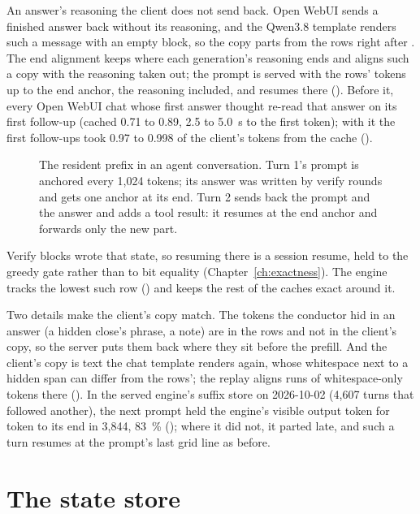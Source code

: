 An answer's reasoning the client does not send back. Open WebUI sends a finished answer back without its reasoning, and the Qwen3.8 template renders such a message with an empty  block, so the copy parts from the rows right after . The end alignment keeps where each generation's reasoning ends and aligns such a copy with the reasoning taken out; the prompt is served with the rows' tokens up to the end anchor, the reasoning included, and resumes there (). Before it, every Open WebUI chat whose first answer thought re-read that answer on its first follow-up (cached 0.71 to 0.89, 2.5 to 5.0~s to the first token); with it the first follow-ups took 0.97 to 0.998 of the client's tokens from the cache (\measured).

\begin{figure}[htbp]
\centering

\caption[The resident prefix and the end anchor]{The resident prefix in an agent conversation. Turn 1's prompt is anchored every 1,024 tokens; its answer was written by verify rounds and gets one anchor at its end. Turn 2 sends back the prompt and the answer and adds a tool result: it resumes at the end anchor and forwards only the new part.}\label{fig:resident}
\end{figure}

Verify blocks wrote that state, so resuming there is a session resume, held to the greedy gate rather than to bit equality (Chapter~\ref{ch:exactness}). The engine tracks the lowest such row () and keeps the rest of the caches exact around it.

Two details make the client's copy match. The tokens the conductor hid in an answer (a hidden close's phrase, a note) are in the rows and not in the client's copy, so the server puts them back where they sit before the prefill. And the client's copy is text the chat template renders again, whose whitespace next to a hidden span can differ from the rows'; the replay aligns runs of whitespace-only tokens there (). In the served engine's suffix store on 2026-10-02 (4,607 turns that followed another), the next prompt held the engine's visible output token for token to its end in 3,844, 83~\% (\measured); where it did not, it parted late, and such a turn resumes at the prompt's last grid line as before.

\section{The state store}


